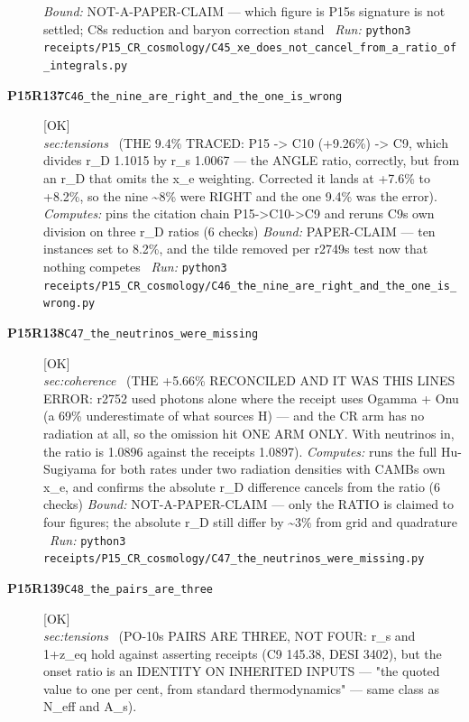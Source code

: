 \begin{description}
 \emph{Bound:} NOT-A-PAPER-CLAIM --- which figure is P15s signature is not settled; C8s reduction and baryon correction stand
\ \emph{Run:} \texttt{python3 receipts/P15\_CR\_cosmology/C45\_xe\_does\_not\_cancel\_from\_a\_ratio\_of\_integrals.py}
\item[\rcptlabel{C46_the_nine_are_right_and_the_one_is_wrong}{P15R137}\textbf{P15R137}\quad\texttt{C46\_the\_nine\_are\_right\_and\_the\_one\_is\_wrong}]\hfill\textsf{[OK]}\\
\textit{sec:tensions} \ (THE 9.4\% TRACED: P15 -> C10 (+9.26\%) -> C9, which divides r\_D 1.1015 by r\_s 1.0067 --- the ANGLE ratio, correctly, but from an r\_D that omits the x\_e weighting. Corrected it lands at +7.6\% to +8.2\%, so the nine \textasciitilde{}8\% were RIGHT and the one 9.4\% was the error). 
\emph{Computes:} pins the citation chain P15->C10->C9 and reruns C9s own division on three r\_D ratios (6 checks)
 \emph{Bound:} PAPER-CLAIM --- ten instances set to 8.2\%, and the tilde removed per r2749s test now that nothing competes
\ \emph{Run:} \texttt{python3 receipts/P15\_CR\_cosmology/C46\_the\_nine\_are\_right\_and\_the\_one\_is\_wrong.py}
\item[\rcptlabel{C47_the_neutrinos_were_missing}{P15R138}\textbf{P15R138}\quad\texttt{C47\_the\_neutrinos\_were\_missing}]\hfill\textsf{[OK]}\\
\textit{sec:coherence} \ (THE +5.66\% RECONCILED AND IT WAS THIS LINES ERROR: r2752 used photons alone where the receipt uses Ogamma + Onu (a 69\% underestimate of what sources H) --- and the CR arm has no radiation at all, so the omission hit ONE ARM ONLY. With neutrinos in, the ratio is 1.0896 against the receipts 1.0897). 
\emph{Computes:} runs the full Hu-Sugiyama for both rates under two radiation densities with CAMBs own x\_e, and confirms the absolute r\_D difference cancels from the ratio (6 checks)
 \emph{Bound:} NOT-A-PAPER-CLAIM --- only the RATIO is claimed to four figures; the absolute r\_D still differ by \textasciitilde{}3\% from grid and quadrature
\ \emph{Run:} \texttt{python3 receipts/P15\_CR\_cosmology/C47\_the\_neutrinos\_were\_missing.py}
\item[\rcptlabel{C48_the_pairs_are_three}{P15R139}\textbf{P15R139}\quad\texttt{C48\_the\_pairs\_are\_three}]\hfill\textsf{[OK]}\\
\textit{sec:tensions} \ (PO-10s PAIRS ARE THREE, NOT FOUR: r\_s and 1+z\_eq hold against asserting receipts (C9 145.38, DESI 3402), but the onset ratio is an IDENTITY ON INHERITED INPUTS --- "the quoted value to one per cent, from standard thermodynamics" --- same class as N\_eff and A\_s). 

\end{description}
